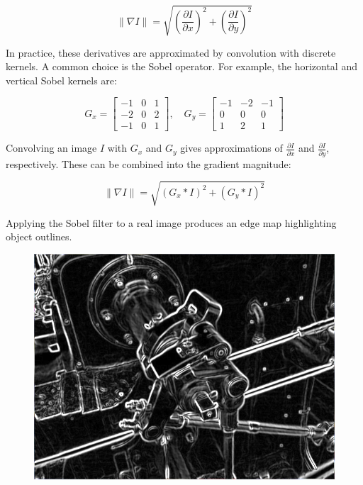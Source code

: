 \documentclass[12pt]{article}
\begin{document}
\[ \|\nabla I\| = \sqrt{\left(\frac{\partial I}{\partial x}\right)^2 + \left(\frac{\partial I}{\partial y}\right)^2} \]

In practice, these derivatives are approximated by convolution with discrete kernels. A common choice is the Sobel operator. For example, the horizontal and vertical Sobel kernels are:

\[
G_x = \begin{bmatrix}-1 & 0 & 1 \\ -2 & 0 & 2 \\ -1 & 0 & 1\end{bmatrix}, \quad G_y = \begin{bmatrix}-1 & -2 & -1 \\ 0 & 0 & 0 \\ 1 & 2 & 1\end{bmatrix}
\]

Convolving an image \( I \) with \( G_x \) and \( G_y \) gives approximations of \( \frac{\partial I}{\partial x} \) and \( \frac{\partial I}{\partial y} \), respectively. These can be combined into the gradient magnitude:

\[ \|\nabla I\| = \sqrt{(G_x * I)^2 + (G_y * I)^2} \]

Applying the Sobel filter to a real image produces an edge map highlighting object outlines. 


\begin{figure}[h!]
    \centering
    \begin{tcolorbox}[colframe=black!80, colback=white, boxrule=0.5mm, arc=6pt, width=0.65\textwidth]
        \includegraphics[width=\linewidth]{sobel_edge_detection_example.png}
    \end{tcolorbox}
    \label{fig:sobel}
\end{figure}
\end{document}
